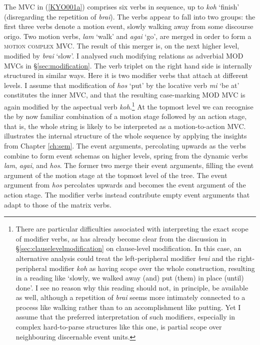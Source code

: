 The MVC in (\ref{KYO001a}) comprises six verbs in sequence, up to \textit{koh} `finish' (disregarding the repetition of \textit{brai}). The verbs appear to fall into two groups: the first three verbs denote a motion event, slowly walking away from some discourse origo. Two motion verbs, \textit{lam} `walk' and \textit{agai} `go', are merged in order to form a \textsc{motion complex} MVC. The result of this merger is, on the next higher level, modified by \textit{brai} `slow'. I analysed such modifying relations as adverbial MOD MVCs in §\ref{sec:modification}. The verb triplet on the right hand side is internally structured in similar ways. Here it is two modifier verbs that attach at different levels. I assume that modification of \textit{hos} `put' by the locative verb \textit{mi} `be at' constitutes the inner MVC, and that the resulting case-marking MOD MVC is again modified by the aspectual verb \textit{koh}.\footnote{There are particular difficulties associated with interpreting the exact scope of modifier verbs, as has already become clear from the discussion in §\ref{sec:clauselevelmodification} on clause-level modification. In this case, an alternative analysis could treat the left-peripheral modifier \textit{brai} and the right-peripheral modifier \textit{koh} as having scope over the whole construction, resulting in a reading like `slowly, we walked away (and) put (them) in place (until) done'. I see no reason why this reading should not, in principle, be available as well, although a repetition of \textit{brai} seems more intimately connected to a process like walking rather than to an accomplishment like putting. Yet I assume that the preferred interpretation of such modifiers, especially in complex hard-to-parse structures like this one, is partial scope over neighbouring discernable event units.} At the topmost level we can recognise the by now familiar combination of a motion stage followed by an action stage, that is, the whole string is likely to be interpreted as a motion-to-action MVC.  illustrates the internal structure of the whole sequence by applying the insights from Chapter \ref{ch:sem}. The event arguments, percolating upwards as the verbs combine to form event schemas on higher levels, spring from the dynamic verbs \textit{lam}, \textit{agai}, and \textit{hos}. The former two merge their event arguments, filling the event argument of the motion stage at the topmost level of the tree. The event argument from \textit{hos} percolates upwards and becomes the event argument of the action stage. The modifier verbs instead contribute empty event arguments that adapt to those of the matrix verbs.

